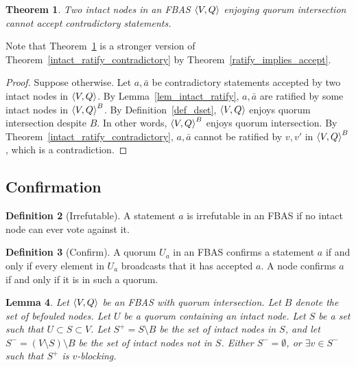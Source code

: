 \documentclass[12pt, psamsfonts]{amsart}
\newtheorem{thm}{Theorem}[subsection]
\newtheorem{lem}[thm]{Lemma}
\theoremstyle{definition}
\newtheorem{defn}[thm]{Definition}
\theoremstyle{remark}
\numberwithin{equation}{subsection}
\begin{document}
\begin{thm}\label{intact_accept_contradictory}
    Two intact nodes in an FBAS $\ev{V, Q}$ enjoying quorum intersection cannot accept contradictory statements.
\end{thm}

Note that Theorem~\ref{intact_accept_contradictory} is a stronger version of Theorem~\ref{intact_ratify_contradictory} by Theorem~\ref{ratify_implies_accept}.

\begin{proof}
    Suppose otherwise.
    Let $a, \bar{a}$ be contradictory statements accepted by two intact nodes in $\ev{V, Q}$.
    By Lemma~\ref{lem_intact_ratify}, $a, \bar{a}$ are ratified by some intact nodes in $\ev{V, Q}^B$.
    By Definition~\ref{def_dset}, $\ev{V, Q}$ enjoys quorum intersection despite $B$.
    In other words, $\ev{V, Q}^B$ enjoys quorum intersection.
    By Theorem~\ref{intact_ratify_contradictory}, $a, \bar{a}$ cannot be ratified by $v, v'$ in $\ev{V, Q}^B$, which is a contradiction.
\end{proof}

\subsection{Confirmation}

\begin{defn}[Irrefutable]\label{def_irrefutable}
    A statement $a$ is irrefutable in an FBAS if no intact node can ever vote against it.
\end{defn}

\begin{defn}[Confirm]\label{def_confirm}
    A quorum $U_a$ in an FBAS confirms a statement $a$ if and only if every element in $U_a$ broadcasts that it has accepted $a$.
    A node confirms $a$ if and only if it is in such a quorum.
\end{defn}

\begin{lem}\label{lemma_for_every_intact_node}
    Let $\ev{V, Q}$ be an FBAS with quorum intersection.
    Let $B$ denote the set of befouled nodes.
    Let $U$ be a quorum containing an intact node.
    Let $S$ be a set such that $U \subset S \subset V$.
    Let $S^{+} = S \setminus B$ be the set of intact nodes in $S$, and let $S^{-} = (V \setminus S) \setminus B$ be the set of intact nodes not in $S$.
    Either $S^{-} = \emptyset$, or $\exists v \in S^{-}$ such that $S^{+}$ is $v$-blocking.
\end{lem}
\end{document}
